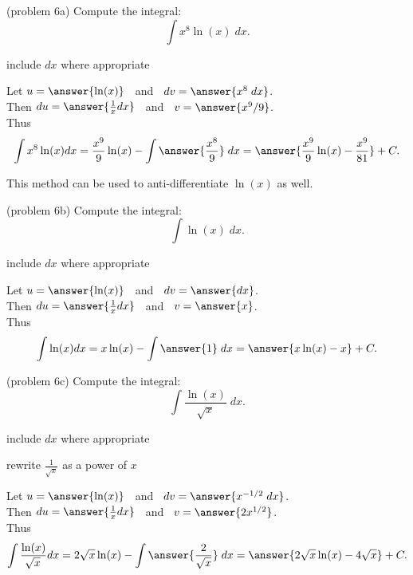 \documentclass{ximera}
\begin{document}
\begin{problem}(problem 6a)
  Compute the integral:
  \[
  \int x^8 \ln(x) \;dx.
  \]
  
  \begin{hint}
      include $dx$ where appropriate
  \end{hint}
  Let $u = \answer{\ln(x)}\;\;$   and   $\;\;dv = \answer{x^8 \;dx}$.\\
  Then $du = \answer{\frac{1}{x} dx}\;\;$   and   $\;\;v = \answer{x^9/9}$.\\
  Thus 
  \[
  \int x^8 \ln(x) dx = \frac{x^9}{9}\ln(x) - \int \answer{\frac{x^8}{9}} \;dx = \answer{\frac{x^9}{9}\ln(x) -\frac{x^9}{81}} + C.
  \]

\end{problem}

This method can be used to anti-differentiate $\ln(x)$ as well.


\begin{problem}(problem 6b) 
  Compute the integral:
  \[
  \int \ln(x) \;dx.
  \]
  
  \begin{hint}
      include $dx$ where appropriate
  \end{hint}
  Let $u = \answer{\ln(x)}\;\;$   and   $\;\;dv = \answer{dx}$.\\
  Then $du = \answer{\frac{1}{x} dx}\;\;$   and   $\;\;v = \answer{x}$.\\
  Thus 
  \[
  \int  \ln(x) dx = x\ln(x) - \int \answer{1} \;dx = \answer{x\ln(x) -x} + C.
  \]

\end{problem}

\begin{problem}(problem 6c)
  Compute the integral:
  \[
  \int \frac{\ln(x)}{\sqrt x} \;dx.
  \]
  
  \begin{hint}
      include $dx$ where appropriate
  \end{hint}
  \begin{hint}
      rewrite $\frac{1}{\!\sqrt x}$ as a power of $x$
  \end{hint}
  Let $u = \answer{\ln(x)}\;\;$   and   $\;\;dv = \answer{x^{-1/2} \;dx}$.\\
  Then $du = \answer{\frac{1}{x} dx}\;\;$   and   $\;\;v = \answer{2x^{1/2}}$.\\
  Thus 
  \[
  \int \frac{\ln(x)}{\!\sqrt x} dx = 2\sqrt x \ln(x) - \int \answer{\frac{2}{\sqrt x}} \;dx = \answer{2\sqrt x \ln(x) -4\sqrt x} + C.
  \]

\end{problem}
\end{document}
